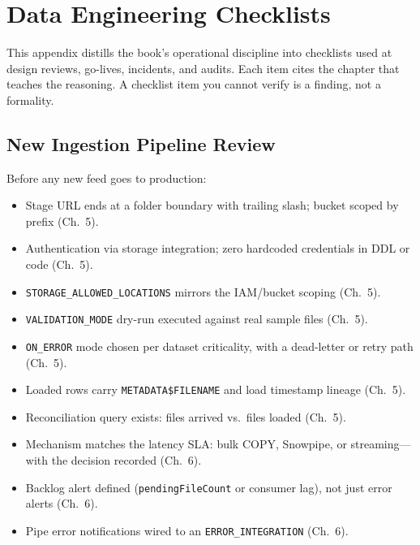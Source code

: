 \chapter{Data Engineering Checklists}
%
This appendix distills the book's operational discipline into checklists used at design reviews, go-lives, incidents, and audits. Each item cites the chapter that teaches the reasoning. A checklist item you cannot verify is a finding, not a formality.

\section{New Ingestion Pipeline Review}
Before any new feed goes to production:
\begin{itemize}
    \item[$\square$] Stage URL ends at a folder boundary with trailing slash; bucket scoped by prefix (Ch.~5).
    \item[$\square$] Authentication via storage integration; zero hardcoded credentials in DDL or code (Ch.~5).
    \item[$\square$] \texttt{STORAGE\_ALLOWED\_LOCATIONS} mirrors the IAM/bucket scoping (Ch.~5).
    \item[$\square$] \texttt{VALIDATION\_MODE} dry-run executed against real sample files (Ch.~5).
    \item[$\square$] \texttt{ON\_ERROR} mode chosen per dataset criticality, with a dead-letter or retry path (Ch.~5).
    \item[$\square$] Loaded rows carry \texttt{METADATA\$FILENAME} and load timestamp lineage (Ch.~5).
    \item[$\square$] Reconciliation query exists: files arrived vs.\ files loaded (Ch.~5).
    \item[$\square$] Mechanism matches the latency SLA: bulk COPY, Snowpipe, or streaming---with the decision recorded (Ch.~6).
    \item[$\square$] Backlog alert defined (\texttt{pendingFileCount} or consumer lag), not just error alerts (Ch.~6).
    \item[$\square$] Pipe error notifications wired to an \texttt{ERROR\_INTEGRATION} (Ch.~6).
\end{itemize}

